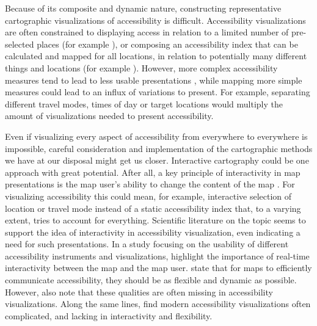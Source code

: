 
Because of its composite and dynamic nature,
constructing representative cartographic visualizations of accessibility is difficult.
Accessibility visualizations are often constrained
to displaying access in relation to
a limited number of pre-selected places (for example \textcite{wei2018}),
or composing an accessibility index
that can be calculated and mapped for all locations,
in relation to potentially many different things and locations
(for example \textcite{kim2019}).
However, more complex accessibility measures tend to lead to
less usable presentations \parencite{te2014},
while mapping more simple measures could lead to an influx of variations to present.
For example, separating different travel modes, times of day or target locations
would multiply the amount of visualizations needed to present accessibility.




Even if visualizing every aspect of accessibility
from everywhere to everywhere is impossible,
careful consideration and implementation
of the cartographic methods we have at our disposal might get us closer.
Interactive cartography could be one approach with great potential.
After all, a key principle of interactivity in map presentations is
the map user's ability to change the content of the map \parencite{rot2013b}.
For visualizing accessibility this could mean, for example,
interactive selection of location or travel mode instead of
a static accessibility index that, to a varying extent,
tries to account for everything.
Scientific literature on the topic seems to support the idea of
interactivity in accessibility visualization,
even indicating a need for such presentations.
In a study focusing on the usability of
different accessibility instruments and visualizations,  %
\textcite{te2014} highlight the importance of
real-time interactivity between the map and the map user.
\textcite{but2018} state that for maps to efficiently communicate accessibility,
they should be as flexible and dynamic as possible.
However, \textcite{but2018} also note that
these qualities are often missing in accessibility visualizations.
Along the same lines,
\textcite{paj2021} find modern accessibility visualizations often complicated,
and lacking in interactivity and flexibility.


